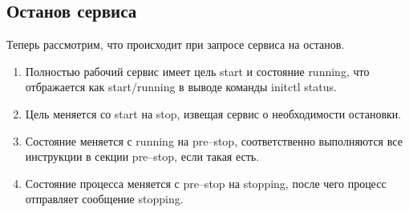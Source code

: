 \subsection*{Останов сервиса}
Теперь рассмотрим, что происходит при запросе сервиса на останов. \begin{enumerate}
\item Полностью рабочий сервис имеет цель start и состояние running, что отбражается как start/running в выводе команды initctl status.
\item Цель меняется со start на stop, извещая сервис о необходимости остановки.
\item Состояние меняется с running на pre--stop, соответственно выполняются все инструкции в секции pre--stop, если такая есть.
\item Состояние процесса меняется с pre--stop на stopping, после чего процесс отправляет сообщение stopping.


\end{enumerate}
